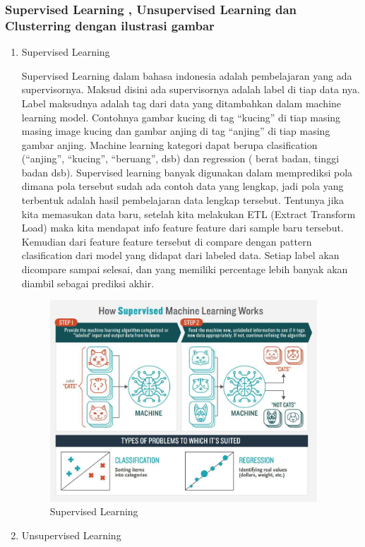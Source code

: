 \subsubsection{Supervised Learning , Unsupervised Learning dan Clusterring dengan ilustrasi gambar }

\begin{enumerate}
\item Supervised Learning

Supervised Learning dalam bahasa indonesia adalah pembelajaran yang ada supervisornya. Maksud disini ada supervisornya adalah label di tiap data nya. Label maksudnya adalah tag dari data yang ditambahkan dalam machine learning model. Contohnya gambar kucing di tag “kucing” di tiap masing masing image kucing dan gambar anjing di tag “anjing” di tiap masing gambar anjing. Machine learning kategori dapat berupa clasification (“anjing”, “kucing”, “beruang”, dsb) dan regression ( berat badan, tinggi badan dsb). Supervised learning banyak digunakan dalam memprediksi pola dimana pola tersebut sudah ada contoh data yang lengkap, jadi pola yang terbentuk adalah hasil pembelajaran data lengkap tersebut. Tentunya jika kita memasukan data baru, setelah kita melakukan ETL (Extract Transform Load) maka kita mendapat info feature feature dari sample baru tersebut. Kemudian dari feature feature tersebut di compare dengan pattern clasification dari model yang didapat dari labeled data. Setiap label akan dicompare sampai selesai, dan yang memiliki percentage lebih banyak akan diambil sebagai prediksi akhir.
\begin{figure}[H]
\centerline{\includegraphics[width=10cm]{figures/1174080/2/2.jpeg}}
\caption{Supervised Learning}
\label{labelgambar}
\end{figure}

\item Unsupervised Learning


\end{enumerate}
